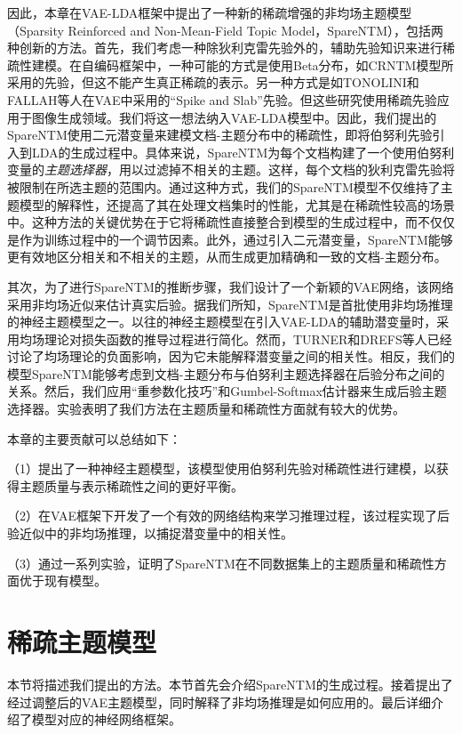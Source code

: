 因此，本章在VAE-LDA框架中提出了一种新的稀疏增强的非均场主题模型（Sparsity Reinforced and Non-Mean-Field Topic Model，SpareNTM），包括两种创新的方法。首先，我们考虑一种除狄利克雷先验外的，辅助先验知识来进行稀疏性建模。在自编码框架中，一种可能的方式是使用Beta分布，如CRNTM模型\cite{CRNTM}所采用的先验，但这不能产生真正稀疏的表示。另一种方式是如TONOLINI和FALLAH等人\cite{VSC,VSCT,EVO_bi}在VAE中采用的“Spike and Slab”\cite{spike&slab}先验。但这些研究使用稀疏先验应用于图像生成领域。我们将这一想法纳入VAE-LDA模型中。因此，我们提出的SpareNTM使用二元潜变量来建模文档-主题分布中的稀疏性，即将伯努利先验引入到LDA的生成过程中。具体来说，SpareNTM为每个文档构建了一个使用伯努利变量的\textit{主题选择器}，用以过滤掉不相关的主题。这样，每个文档的狄利克雷先验将被限制在所选主题的范围内。通过这种方式，我们的SpareNTM模型不仅维持了主题模型的解释性，还提高了其在处理文档集时的性能，尤其是在稀疏性较高的场景中。这种方法的关键优势在于它将稀疏性直接整合到模型的生成过程中，而不仅仅是作为训练过程中的一个调节因素。此外，通过引入二元潜变量，SpareNTM能够更有效地区分相关和不相关的主题，从而生成更加精确和一致的文档-主题分布。

其次，为了进行SpareNTM的推断步骤，我们设计了一个新颖的VAE网络，该网络采用非均场近似来估计真实后验。据我们所知，SpareNTM是首批使用非均场推理的神经主题模型之一。以往的神经主题模型\cite{CRNTM,TopicRNN,VRTM,SGTM}在引入VAE-LDA的辅助潜变量时，采用均场理论\cite{VI}对损失函数的推导过程进行简化。然而，TURNER和DREFS等人\cite{MFnegative,EVO}已经讨论了均场理论的负面影响，因为它未能解释潜变量之间的相关性。相反，我们的模型SpareNTM能够考虑到文档-主题分布与伯努利主题选择器在后验分布之间的关系。然后，我们应用“重参数化技巧”\cite{VAE}和Gumbel-Softmax估计器\cite{gumbel}来生成后验主题选择器。实验表明了我们方法在主题质量和稀疏性方面就有较大的优势。

本章的主要贡献可以总结如下：

（1）提出了一种神经主题模型，该模型使用伯努利先验对稀疏性进行建模，以获得主题质量与表示稀疏性之间的更好平衡。

（2）在VAE框架下开发了一个有效的网络结构来学习推理过程，该过程实现了后验近似中的非均场推理，以捕捉潜变量中的相关性。

（3）通过一系列实验，证明了SpareNTM在不同数据集上的主题质量和稀疏性方面优于现有模型。

\section{稀疏主题模型}
本节将描述我们提出的方法。本节首先会介绍SpareNTM的生成过程。接着提出了经过调整后的VAE主题模型，同时解释了非均场推理是如何应用的。最后详细介绍了模型对应的神经网络框架。

